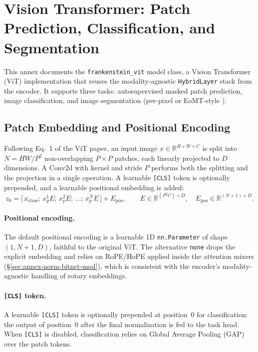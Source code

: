 \section{Vision Transformer: Patch Prediction, Classification, and Segmentation}
\label{sec:annex-vision}

This annex documents the \texttt{frankenstein\_vit} model class, a Vision Transformer (ViT) implementation \citep{dosovitskiy2021vit} that reuses the modality-agnostic \texttt{HybridLayer} stack from the encoder. It supports three tasks: autosupervised masked patch prediction, image classification, and image segmentation (per-pixel or EoMT-style \citep{kerssies2025eomt}).

\subsection{Patch Embedding and Positional Encoding}

Following Eq.~1 of the ViT paper, an input image $x \in \mathbb{R}^{H \times W \times C}$ is split into $N = HW/P^2$ non-overlapping $P \times P$ patches, each linearly projected to $D$ dimensions. A Conv2d with kernel and stride $P$ performs both the splitting and the projection in a single operation. A learnable \texttt{[CLS]} token is optionally prepended, and a learnable positional embedding is added:
\[
z_0 = \big[\,x_\text{class};\, x_p^1 E;\, x_p^2 E;\, \dots;\, x_p^N E\,\big] + E_\text{pos},
\qquad
E \in \mathbb{R}^{(P^2 C) \times D},\quad
E_\text{pos} \in \mathbb{R}^{(N+1) \times D}.
\]

\paragraph{Positional encoding.}
The default positional encoding is a learnable 1D \texttt{nn.Parameter} of shape $(1, N+1, D)$, faithful to the original ViT. The alternative \texttt{none} drops the explicit embedding and relies on RoPE/HoPE applied inside the attention mixers (§\ref{sec:annex-norm-bitnet-mod}), which is consistent with the encoder's modality-agnostic handling of rotary embeddings.

\paragraph{\texttt{[CLS]} token.}
A learnable \texttt{[CLS]} token is optionally prepended at position~$0$ for classification: the output of position~$0$ after the final normalization is fed to the task head. When \texttt{[CLS]} is disabled, classification relies on Global Average Pooling (GAP) over the patch tokens.


